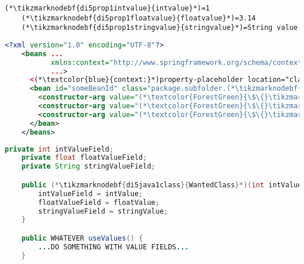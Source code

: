 \newline
{}
\begin{lstlisting}[title={A \textit{.properties} file called \tikzmarknodebf{di5prop1filename}{\textit{constructor.properties}}}]
    (*\tikzmarknodebf{di5prop1intvalue}{intvalue}*)=1
    (*\tikzmarknodebf{di5prop1floatvalue}{floatvalue}*)=3.14
    (*\tikzmarknodebf{di5prop1stringvalue}{stringvalue}*)=String value
\end{lstlisting}
\begin{lstlisting}[language=XML, title={Configuration XML}]
    <?xml version="1.0" encoding="UTF-8"?>
    <beans ...
           xmlns:context="http://www.springframework.org/schema/context"
           ...>
      <(*\textcolor{blue}{context:}*)property-placeholder location="classpath:(*\tikzmarknodebf{di5xml1filename}{constructor.properties}[ForestGreen]*)"/>
      <bean id="someBeanId" class="package.subfolder.(*\tikzmarknodebf{di5xml1class}{WantedClass}[ForestGreen]*)">
        <constructor-arg value="(*\textcolor{ForestGreen}{\$\{}\tikzmarknodebf{di5xml1intvalue}{intvalue}[ForestGreen]\textcolor{ForestGreen}{\}}*)"/>
        <constructor-arg value="(*\textcolor{ForestGreen}{\$\{}\tikzmarknodebf{di5xml1floatvalue}{floatvalue}[ForestGreen]\textcolor{ForestGreen}{\}}*)"/>
        <constructor-arg value="(*\textcolor{ForestGreen}{\$\{}\tikzmarknodebf{di5xml1stringvalue}{stringvalue}[ForestGreen]\textcolor{ForestGreen}{\}}*)"/>
      </bean>
    </beans>
\end{lstlisting}
\begin{lstlisting}[language=Java, title={Wanted class with the constructor}]
    private int intValueField;
    private float floatValueField;
    private String stringValueField;

    public (*\tikzmarknodebf{di5java1class}{WantedClass}*)(int intValue, float floatValue, String stringValue) {
        intValueField = intValue;
        floatValueField = floatValue;
        stringValueField = stringValue;
    }

    public WHATEVER useValues() {
        ...DO SOMETHING WITH VALUE FIELDS...
    }
\end{lstlisting}
\newpage

